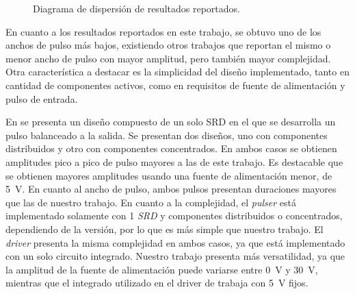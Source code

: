 \begin{figure}
\centering
{}
  \caption{Diagrama de dispersión de resultados reportados.}
  \label{fig:scatterplot_literature}
\end{figure}

En cuanto a los resultados reportados en este trabajo, se obtuvo uno de los
anchos de pulso más bajos, existiendo otros trabajos que reportan el mismo o
menor ancho de pulso con mayor amplitud, pero también mayor complejidad. Otra
característica a destacar es la simplicidad del diseño implementado, tanto en
cantidad de componentes activos, como en requisitos de fuente de alimentación y
pulso de entrada.

En \cite{rulikowski2004} se presenta un diseño compuesto de un solo SRD en el
que se desarrolla un pulso balanceado a la salida. Se presentan dos diseños, uno
con componentes distribuidos y otro con componentes concentrados. En ambos casos
se obtienen amplitudes pico a pico de pulso mayores a las de este trabajo. Es
destacable que se obtienen mayores amplitudes usando una fuente de alimentación
menor, de \qty{5}{\volt}. En cuanto al ancho de pulso, ambos pulsos presentan
duraciones mayores que las de nuestro trabajo. En cuanto a la complejidad, el
\textit{pulser} está implementado solamente con 1 \textit{SRD} y componentes
distribuidos o concentrados, dependiendo de la versión, por lo que es más simple
que nuestro trabajo. El \textit{driver} presenta la misma complejidad en ambos
casos, ya que está implementado con un solo circuito integrado. Nuestro trabajo
presenta más versatilidad, ya que la amplitud de la fuente de alimentación puede
variarse entre \qty{0}{\volt} y \qty{30}{\volt}, mientras que el integrado
utilizado en el driver de \cite{rulikowski2004} trabaja con \qty{5}{\volt}
fijos.

